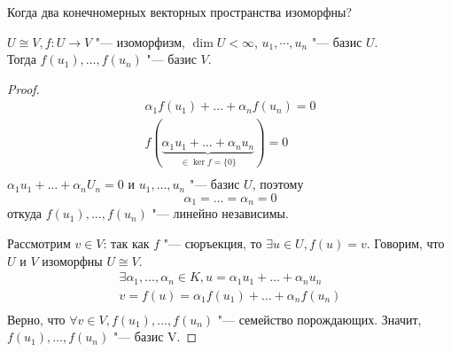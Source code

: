Когда два конечномерных векторных пространства изоморфны?
\begin{lemma}
	$U \cong V, f \colon U \to V$ "--- изоморфизм, $\dim U < \infty$, $u_1, \cdots, u_n$ "--- базис $U$.\\
	Тогда $f(u_1), \dots, f(u_n)$ "--- базис $V$.
\end{lemma}
\begin{proof}
	\begin{gather*}
		\alpha_1 f(u_1) + \dots + \alpha_nf(u_n) = 0 \\
		f(\underbrace{\alpha_1 u_1 + \dots + \alpha_nu_n}_{\in\ker f = \{0\}}) = 0 \\
	\end{gather*}
	$\alpha_1u_1 + \dots + \alpha_nU_n = 0$ и $u_1, \dots, u_n$ "--- базис $U$, поэтому
	\[ \alpha_1 = \dots = \alpha_n = 0 \]
	откуда $f(u_1), \dots, f(u_n)$ "--- линейно независимы.

	Рассмотрим $v \in V$: так как $f$ "--- сюръекция, то $\exists u \in U, f(u) = v$.
	Говорим, что $U$ и $V$ изоморфны $U \cong V$.
	\begin{gather*}
		\exists \alpha_1, \dots, \alpha_n \in  K, u = \alpha_1 u_1 + \dots + \alpha_nu_n \\
		v = f(u) = \alpha_1f(u_1) + \dots + \alpha_nf(u_n) \\
	\end{gather*}
	Верно, что $\forall v \in V, f(u_1), \dots, f(u_n)$ "--- семейство порождающих.
	Значит, $f(u_1), \dots, f(u_n)$ "--- базис V.
\end{proof}

